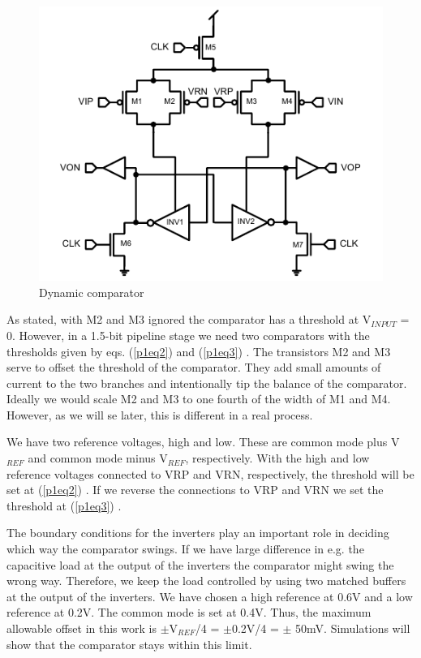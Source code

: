\begin{figure}[htbp]
\centerline{\includegraphics[width=\myfigwidth]{img0}}
  \caption{Dynamic comparator}
  \label{p1fig:dccomp}
\end{figure}

As stated, with M2 and M3 ignored the comparator has a threshold at
V$_{INPUT}$ = 0. However, in a 1.5-bit pipeline stage we need two
comparators with the thresholds given by eqs. (\ref{p1eq2})
and (\ref{p1eq3}) \cite{sumanen00}.  The transistors M2 and M3 serve to offset the threshold of the
comparator. They add small amounts of current to the two branches and
intentionally tip the balance of the comparator. Ideally we would scale
M2 and M3 to one fourth of the width of M1 and M4. However, as we will
se later, this is different in a real process.
 


We have two reference voltages, high and low. These are common mode
plus V$_{REF}$ and common mode minus V$_{REF}$, respectively. With the
high and low reference voltages connected to VRP and VRN, respectively,
the threshold will be set at (\ref{p1eq2})
. If we reverse the connections to VRP and VRN we set the threshold at
(\ref{p1eq3})
.
 


The boundary conditions for the inverters play an important role in
deciding which way the comparator swings. If we have large difference
in e.g. the capacitive load at the output of the inverters the
comparator might swing the wrong way. Therefore, we keep the load
controlled by using two matched buffers at the output of the inverters.
We have chosen a high reference at 0.6V and a low reference at 0.2V.
The common mode is set at 0.4V. Thus, the maximum allowable offset in
this work is \begin{math}\pm{}\end{math}V$_{REF}$/4 =
\begin{math}\pm{}\end{math}0.2V/4 = \begin{math}\pm{}\end{math} 50mV.
Simulations will show that the comparator stays within this limit.
 

